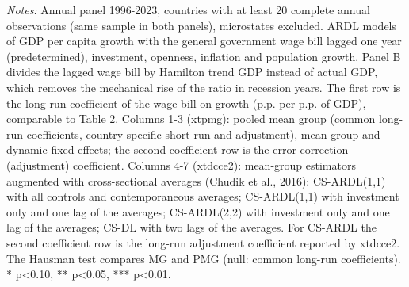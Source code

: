 \begin{table}[htbp]
\begin{minipage}{0.95\linewidth}\vspace{4pt}\scriptsize \textit{Notes:} Annual panel 1996-2023, countries with at least 20 complete annual observations (same sample in both panels), microstates excluded. ARDL models of GDP per capita growth with the general government wage bill lagged one year (predetermined), investment, openness, inflation and population growth. Panel B divides the lagged wage bill by Hamilton trend GDP instead of actual GDP, which removes the mechanical rise of the ratio in recession years. The first row is the long-run coefficient of the wage bill on growth (p.p. per p.p. of GDP), comparable to Table 2. Columns 1-3 (xtpmg): pooled mean group (common long-run coefficients, country-specific short run and adjustment), mean group and dynamic fixed effects; the second coefficient row is the error-correction (adjustment) coefficient. Columns 4-7 (xtdcce2): mean-group estimators augmented with cross-sectional averages (Chudik et al., 2016): CS-ARDL(1,1) with all controls and contemporaneous averages; CS-ARDL(1,1) with investment only and one lag of the averages; CS-ARDL(2,2) with investment only and one lag of the averages; CS-DL with two lags of the averages. For CS-ARDL the second coefficient row is the long-run adjustment coefficient reported by xtdcce2. The Hausman test compares MG and PMG (null: common long-run coefficients). * p<0.10, ** p<0.05, *** p<0.01.\end{minipage}
\end{table}
